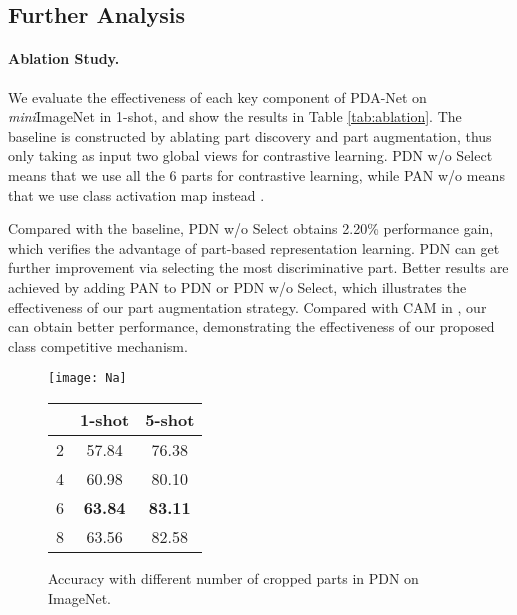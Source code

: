 \documentclass{article}
\makeatletter
\newcommand\tabcaption{\def\@captype{table}\caption}
\makeatother
\begin{document}
\subsection{Further Analysis}
\paragraph{Ablation Study.} We evaluate the effectiveness of each key component of PDA-Net on \emph{mini}ImageNet in 1-shot, and show the results in Table \ref{tab:ablation}. The baseline is constructed by ablating part discovery and part augmentation, thus only taking as input two global views for contrastive learning. PDN w/o Select means that we use all the 6 parts for contrastive learning, while PAN w/o  means that we use class activation map instead \cite{zhou2016learning}.


Compared with the baseline, PDN w/o Select obtains 2.20\% performance gain, which verifies the advantage of part-based representation learning. PDN can get further improvement via selecting the most discriminative part. Better results are achieved by adding PAN to PDN or PDN w/o Select, which illustrates the effectiveness of our part augmentation strategy. Compared with CAM in \cite{zhou2016learning}, our  can obtain better performance, demonstrating the effectiveness of our proposed class competitive mechanism.







\begin{figure}
\begin{minipage}[b]{0.5\linewidth}
\centering
\texttt{[image: Na]}
\caption{Accuracy with different number of augmented features in PAN on ImageNet.}
\label{fig:Na}
\end{minipage}
\hspace{0.8mm}
\begin{minipage}[b]{0.45\linewidth}
\centering
\begin{tabular}{c|cc}
\toprule
 & 1-shot & 5-shot \\
\midrule
2 & 57.84 & 76.38  \\
4 & 60.98 & 80.10 \\
6 & \textbf{63.84} & \textbf{83.11} \\
8 & 63.56  & 82.58  \\
\bottomrule
\end{tabular}
\tabcaption{Accuracy with different number of cropped parts in PDN on ImageNet.}
\label{tab:crop}
\end{minipage}
\end{figure}
\end{document}

